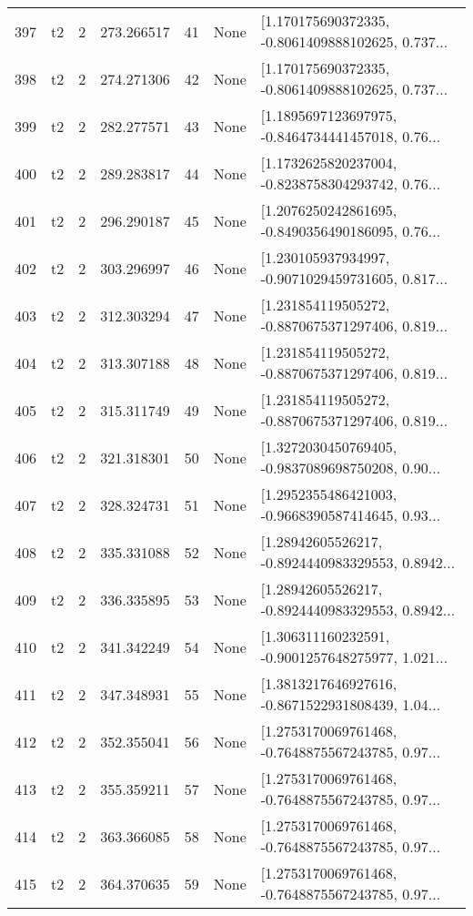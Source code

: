 \begin{tabular}{lllrlll}
397 &  t2 &   2 &   273.266517 &   41 &  None &  [1.170175690372335, -0.8061409888102625, 0.737... \\
398 &  t2 &   2 &   274.271306 &   42 &  None &  [1.170175690372335, -0.8061409888102625, 0.737... \\
399 &  t2 &   2 &   282.277571 &   43 &  None &  [1.1895697123697975, -0.8464734441457018, 0.76... \\
400 &  t2 &   2 &   289.283817 &   44 &  None &  [1.1732625820237004, -0.8238758304293742, 0.76... \\
401 &  t2 &   2 &   296.290187 &   45 &  None &  [1.2076250242861695, -0.8490356490186095, 0.76... \\
402 &  t2 &   2 &   303.296997 &   46 &  None &  [1.230105937934997, -0.9071029459731605, 0.817... \\
403 &  t2 &   2 &   312.303294 &   47 &  None &  [1.231854119505272, -0.8870675371297406, 0.819... \\
404 &  t2 &   2 &   313.307188 &   48 &  None &  [1.231854119505272, -0.8870675371297406, 0.819... \\
405 &  t2 &   2 &   315.311749 &   49 &  None &  [1.231854119505272, -0.8870675371297406, 0.819... \\
406 &  t2 &   2 &   321.318301 &   50 &  None &  [1.3272030450769405, -0.9837089698750208, 0.90... \\
407 &  t2 &   2 &   328.324731 &   51 &  None &  [1.2952355486421003, -0.9668390587414645, 0.93... \\
408 &  t2 &   2 &   335.331088 &   52 &  None &  [1.28942605526217, -0.8924440983329553, 0.8942... \\
409 &  t2 &   2 &   336.335895 &   53 &  None &  [1.28942605526217, -0.8924440983329553, 0.8942... \\
410 &  t2 &   2 &   341.342249 &   54 &  None &  [1.306311160232591, -0.9001257648275977, 1.021... \\
411 &  t2 &   2 &   347.348931 &   55 &  None &  [1.3813217646927616, -0.8671522931808439, 1.04... \\
412 &  t2 &   2 &   352.355041 &   56 &  None &  [1.2753170069761468, -0.7648875567243785, 0.97... \\
413 &  t2 &   2 &   355.359211 &   57 &  None &  [1.2753170069761468, -0.7648875567243785, 0.97... \\
414 &  t2 &   2 &   363.366085 &   58 &  None &  [1.2753170069761468, -0.7648875567243785, 0.97... \\
415 &  t2 &   2 &   364.370635 &   59 &  None &  [1.2753170069761468, -0.7648875567243785, 0.97... \\

\end{tabular}
